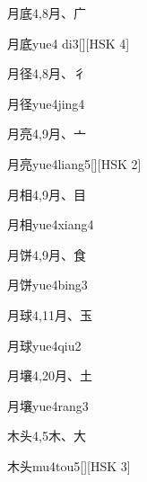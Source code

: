 \begin{entry}{月底}{4,8}{⽉、⼴}
  \begin{phonetics}{月底}{yue4 di3}[][HSK 4]
  \end{phonetics}
\end{entry}

\begin{entry}{月径}{4,8}{⽉、⼻}
  \begin{phonetics}{月径}{yue4jing4}
  \end{phonetics}
\end{entry}

\begin{entry}{月亮}{4,9}{⽉、⼇}
  \begin{phonetics}{月亮}{yue4liang5}[][HSK 2]
  \end{phonetics}
\end{entry}

\begin{entry}{月相}{4,9}{⽉、⽬}
  \begin{phonetics}{月相}{yue4xiang4}
  \end{phonetics}
\end{entry}

\begin{entry}{月饼}{4,9}{⽉、⾷}
  \begin{phonetics}{月饼}{yue4bing3}
  \end{phonetics}
\end{entry}

\begin{entry}{月球}{4,11}{⽉、⽟}
  \begin{phonetics}{月球}{yue4qiu2}
  \end{phonetics}
\end{entry}

\begin{entry}{月壤}{4,20}{⽉、⼟}
  \begin{phonetics}{月壤}{yue4rang3}
  \end{phonetics}
\end{entry}

\begin{entry}{木头}{4,5}{⽊、⼤}
  \begin{phonetics}{木头}{mu4tou5}[][HSK 3]
  \end{phonetics}
\end{entry}

